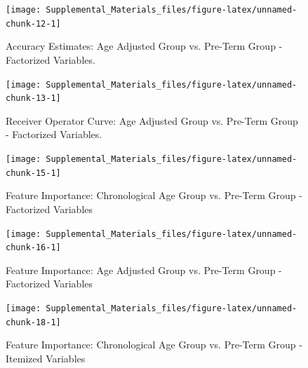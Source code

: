 \documentclass[
]{article}
\begin{document}
\begin{figure}

{\centering \texttt{[image: Supplemental\_Materials\_files/figure-latex/unnamed-chunk-12-1]} 

}

\caption{Accuracy Estimates: Age Adjusted Group vs. Pre-Term Group - Factorized Variables.}\label{fig:unnamed-chunk-12}
\end{figure}

\newpage

\begin{figure}

{\centering \texttt{[image: Supplemental\_Materials\_files/figure-latex/unnamed-chunk-13-1]} 

}

\caption{Receiver Operator Curve: Age Adjusted Group vs. Pre-Term Group - Factorized Variables.}\label{fig:unnamed-chunk-13}
\end{figure}
\newpage

\begin{figure}

{\centering \texttt{[image: Supplemental\_Materials\_files/figure-latex/unnamed-chunk-15-1]} 

}

\caption{Feature Importance: Chronological Age Group vs. Pre-Term Group - Factorized Variables}\label{fig:unnamed-chunk-15}
\end{figure}

\newpage

\begin{figure}

{\centering \texttt{[image: Supplemental\_Materials\_files/figure-latex/unnamed-chunk-16-1]} 

}

\caption{Feature Importance: Age Adjusted Group vs. Pre-Term Group - Factorized Variables}\label{fig:unnamed-chunk-16}
\end{figure}
\newpage

\newpage

\begin{figure}

{\centering \texttt{[image: Supplemental\_Materials\_files/figure-latex/unnamed-chunk-18-1]} 

}

\caption{Feature Importance: Chronological Age Group vs. Pre-Term Group - Itemized Variables}\label{fig:unnamed-chunk-18}
\end{figure}
\end{document}

